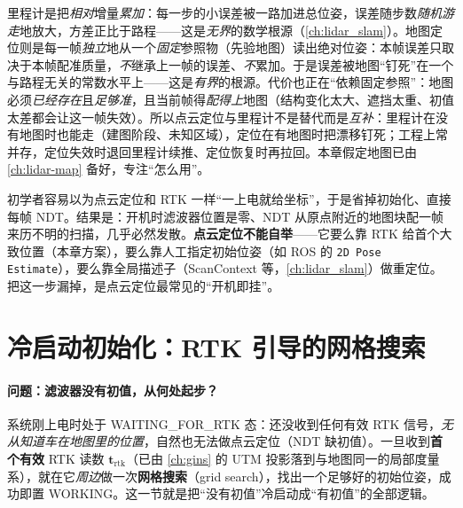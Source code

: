 \begin{insight}\label{ins:lidar-loc-bounded}
里程计是把\emph{相对}增量\emph{累加}：每一步的小误差被一路加进总位姿，误差随步数\emph{随机游走}地放大，方差正比于路程——这是\emph{无界}的数学根源（\cref{ch:lidar_slam}）。地图定位则是每一帧\emph{独立}地从一个\emph{固定}参照物（先验地图）读出绝对位姿：本帧误差只取决于本帧配准质量，\emph{不}继承上一帧的误差、\emph{不}累加。于是误差被地图“钉死”在一个与路程无关的常数水平上——这是\emph{有界}的根源。代价也正在“依赖固定参照”：地图必须\emph{已经存在}且\emph{足够准}，且当前帧得\emph{配得上}地图（结构变化太大、遮挡太重、初值太差都会让这一帧失效）。所以点云定位与里程计不是替代而是\emph{互补}：里程计在没有地图时也能走（建图阶段、未知区域），定位在有地图时把漂移钉死；工程上常并存，定位失效时退回里程计续推、定位恢复时再拉回。本章假定地图已由 \cref{ch:lidar-map} 备好，专注“怎么用”。
\end{insight}

\begin{pitfall}
初学者容易以为点云定位和 RTK 一样“一上电就给坐标”，于是省掉初始化、直接每帧 NDT。结果是：开机时滤波器位置是零、NDT 从原点附近的地图块配一帧来历不明的扫描，几乎必然发散。\textbf{点云定位不能自举}——它要么靠 RTK 给首个大致位置（本章方案），要么靠人工指定初始位姿（如 ROS 的 \texttt{2D Pose Estimate}），要么靠全局描述子（ScanContext 等，\cref{ch:lidar_slam}）做重定位。把这一步漏掉，是点云定位最常见的“开机即挂”。
\end{pitfall}

\section{冷启动初始化：RTK 引导的网格搜索}
\label{sec:lidar-loc-init}

\paragraph{问题：滤波器没有初值，从何处起步？}
系统刚上电时处于 \textsf{WAITING\_FOR\_RTK} 态：还没收到任何有效 RTK 信号，\emph{无从知道车在地图里的位置}，自然也无法做点云定位（NDT 缺初值）。一旦收到\textbf{首个有效} RTK 读数 $\mathbf t_{\mathrm{rtk}}$（已由 \cref{ch:gins} 的 UTM 投影落到与地图同一的局部度量系），就在它\emph{周边}做一次\textbf{网格搜索}（grid search），找出一个足够好的初始位姿，成功即置 \textsf{WORKING}。这一节就是把“没有初值”冷启动成“有初值”的全部逻辑。

